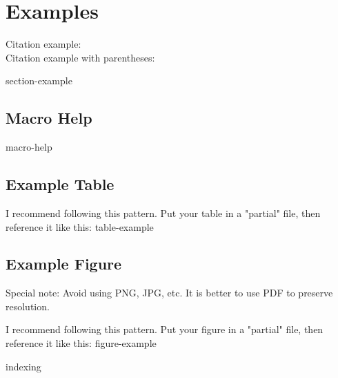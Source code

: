 \chapter{Examples}
Citation example: \cite{ombudsman2024machinery} \\
Citation example with parentheses: \parencite{ombudsman2024machinery}


{section-example}

\section{Macro Help}
{macro-help}


\section{Example Table}
I recommend following this pattern. Put your table in a "partial" file, then reference it like this:
{table-example}


\section{Example Figure}
Special note: Avoid using PNG, JPG, etc. It is better to use PDF to preserve resolution.

I recommend following this pattern. Put your figure in a "partial" file, then reference it like this:
{figure-example}



{indexing}


